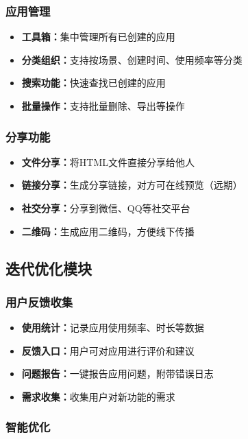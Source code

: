 \documentclass[a4paper,12pt]{ctexart}
\begin{document}
\subsubsection{应用管理}

\begin{itemize}[leftmargin=2em]
    \item \textbf{工具箱：}集中管理所有已创建的应用
    \item \textbf{分类组织：}支持按场景、创建时间、使用频率等分类
    \item \textbf{搜索功能：}快速查找已创建的应用
    \item \textbf{批量操作：}支持批量删除、导出等操作
\end{itemize}

\subsubsection{分享功能}

\begin{itemize}[leftmargin=2em]
    \item \textbf{文件分享：}将HTML文件直接分享给他人
    \item \textbf{链接分享：}生成分享链接，对方可在线预览（远期）
    \item \textbf{社交分享：}分享到微信、QQ等社交平台
    \item \textbf{二维码：}生成应用二维码，方便线下传播
\end{itemize}

\subsection{迭代优化模块}

\subsubsection{用户反馈收集}

\begin{itemize}[leftmargin=2em]
    \item \textbf{使用统计：}记录应用使用频率、时长等数据
    \item \textbf{反馈入口：}用户可对应用进行评价和建议
    \item \textbf{问题报告：}一键报告应用问题，附带错误日志
    \item \textbf{需求收集：}收集用户对新功能的需求
\end{itemize}

\subsubsection{智能优化}
\end{document}
